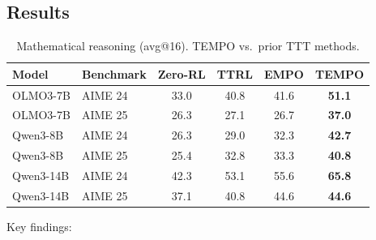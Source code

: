 \documentclass[11pt]{article}
\begin{document}
\subsection{Results}

\begin{table}[h]
\centering
\caption{Mathematical reasoning (avg@16). TEMPO vs.\ prior TTT methods.}
\begin{tabular}{llcccc}
\toprule
\textbf{Model} & \textbf{Benchmark} & \textbf{Zero-RL} & \textbf{TTRL} & \textbf{EMPO} & \textbf{TEMPO} \\
\midrule
OLMO3-7B & AIME 24 & 33.0 & 40.8 & 41.6 & \textbf{51.1} \\
OLMO3-7B & AIME 25 & 26.3 & 27.1 & 26.7 & \textbf{37.0} \\
Qwen3-8B & AIME 24 & 26.3 & 29.0 & 32.3 & \textbf{42.7} \\
Qwen3-8B & AIME 25 & 25.4 & 32.8 & 33.3 & \textbf{40.8} \\
Qwen3-14B & AIME 24 & 42.3 & 53.1 & 55.6 & \textbf{65.8} \\
Qwen3-14B & AIME 25 & 37.1 & 40.8 & 44.6 & \textbf{44.6} \\
\bottomrule
\end{tabular}
\end{table}

Key findings:
\end{document}
